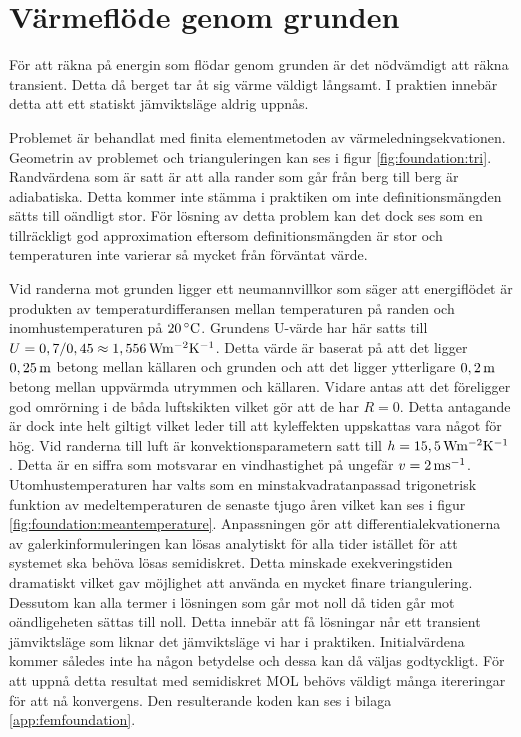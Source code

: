 \section{Värmeflöde genom grunden}

För att räkna på energin som flödar genom grunden är det nödvämdigt att räkna
transient. Detta då berget tar åt sig värme väldigt långsamt. I praktien innebär detta att ett statiskt jämviktsläge aldrig uppnås.

Problemet är behandlat med finita elementmetoden av värmeledningsekvationen.
Geometrin av problemet och trianguleringen kan ses i figur \ref{fig:foundation:tri}.
Randvärdena som är satt är att alla rander som går från berg till berg är adiabatiska.
Detta kommer inte stämma i praktiken om inte definitionsmängden sätts till oändligt
stor. För lösning av detta problem kan det dock ses som en tillräckligt god
approximation eftersom definitionsmängden är stor och temperaturen inte varierar så mycket
från förväntat värde.

Vid randerna mot grunden ligger ett neumannvillkor som säger att energiflödet är produkten
av temperaturdifferansen mellan temperaturen på randen och inomhustemperaturen på $\unit[20]{^\circ C}$.
Grundens U-värde har här satts till $U = 0,7/0,45 \approx \unit[1,556]{ Wm^{-2}K^{-1}}$. Detta värde är
baserat på att det ligger $\unit[0,25]{m}$ betong mellan källaren och grunden och att det ligger ytterligare $\unit[0,2]{m}$
betong mellan uppvärmda utrymmen och källaren. Vidare antas att det föreligger god omrörning i de båda
luftskikten vilket gör att de har $R=0$. Detta antagande är dock inte helt giltigt vilket leder till att kyleffekten
uppskattas vara något för hög.
Vid randerna till luft är konvektionsparametern satt
till $h = \unit[15,5]{Wm^{-2}K^{-1}}$. Detta är en siffra som motsvarar
en vindhastighet på ungefär $v = \unit[2]{ms^{-1}}$. Utomhustemperaturen har valts
som en minstakvadratanpassad trigonetrisk funktion av
medeltemperaturen de senaste tjugo åren vilket kan ses i figur
\ref{fig:foundation:meantemperature}. Anpassningen gör att
differentialekvationerna av galerkinformuleringen kan lösas analytiskt
för alla tider istället för att systemet ska behöva lösas semidiskret.
Detta minskade exekveringstiden dramatiskt vilket gav möjlighet att använda en
mycket finare triangulering. Dessutom kan alla termer i lösningen
som går mot noll då tiden går mot oändligeheten sättas till noll. Detta innebär
att få lösningar når ett transient jämviktsläge som liknar det jämviktsläge vi har i praktiken.
Initialvärdena kommer således inte ha någon betydelse och dessa kan då väljas
godtyckligt. 
För att uppnå detta resultat med semidiskret MOL behövs väldigt många itereringar för att
nå konvergens. Den resulterande koden kan ses i bilaga \ref{app:femfoundation}.

